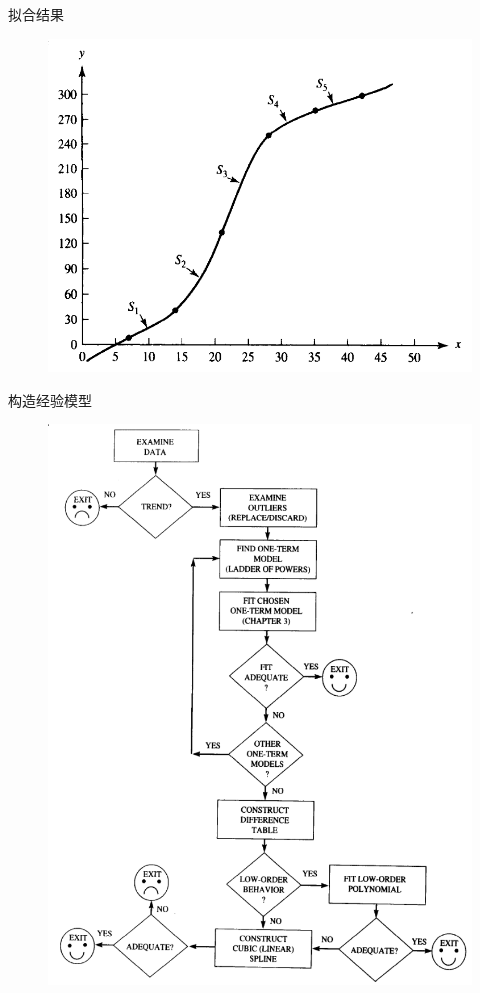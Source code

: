 \documentclass[UTF8]{ctexbeamer}
\begin{document}
\begin{frame}{拟合结果}
  \begin{figure}
    \centering{}
    \includegraphics[width=.8\textwidth{}]{car-fit.png}
  \end{figure}
  

\end{frame}

\begin{frame}{构造经验模型}
  \begin{figure}
    \centering{}
    \includegraphics[height=.8\textheight{}]{model.png}
  \end{figure}

\end{frame}
\end{document}
